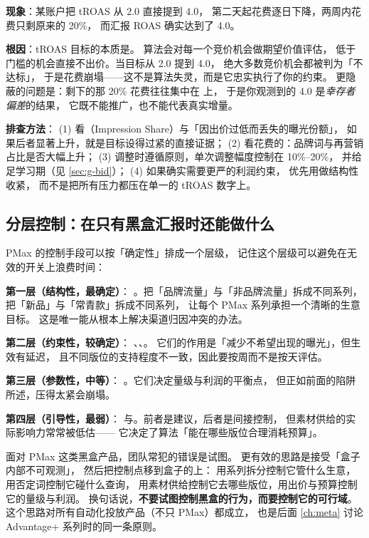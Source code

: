 \begin{pitfall}
\textbf{现象}：某账户把 tROAS 从 2.0 直接提到 4.0，
第二天起花费逐日下降，两周内花费只剩原来的 20\%，
而汇报 ROAS 确实达到了 4.0。

\textbf{根因}：tROAS 目标的本质是。
算法会对每一个竞价机会做期望价值评估，
低于门槛的机会直接不出价。当目标从 2.0 提到 4.0，
绝大多数竞价机会都被判为「不达标」，
于是花费崩塌——这不是算法失灵，而是它忠实执行了你的约束。
更隐蔽的问题是：剩下的那 20\% 花费往往集中在
上，
于是你观测到的 4.0 是\emph{幸存者偏差}的结果，
它既不能推广，也不能代表真实增量。

\textbf{排查方法}：
(1) 看（Impression Share）与「因出价过低而丢失的曝光份额」，
如果后者显著上升，就是目标设得过紧的直接证据；
(2) 看花费的：品牌词与再营销占比是否大幅上升；
(3) 调整时遵循原则，单次调整幅度控制在 10\%--20\%，
并给足学习期（见 \cref{sec:g-bid}）；
(4) 如果确实需要更严的利润约束，
优先用做结构性收紧，
而不是把所有压力都压在单一的 tROAS 数字上。
\end{pitfall}

\subsection{分层控制：在只有黑盒汇报时还能做什么}

PMax 的控制手段可以按「确定性」排成一个层级，
记住这个层级可以避免在无效的开关上浪费时间：

\textbf{第一层（结构性，最确定）}：
。把「品牌流量」与「非品牌流量」拆成不同系列，
把「新品」与「常青款」拆成不同系列，
让每个 PMax 系列承担一个清晰的生意目标。
这是唯一能从根本上解决渠道归因冲突的办法。

\textbf{第二层（约束性，较确定）}：
、、。
它们的作用是「减少不希望出现的曝光」，但生效有延迟，
且不同版位的支持程度不一致，因此要按周而不是按天评估。

\textbf{第三层（参数性，中等）}：
。它们决定量级与利润的平衡点，
但正如前面的陷阱所述，压得太紧会崩塌。

\textbf{第四层（引导性，最弱）}：
与。前者是建议，后者是间接控制，
但素材供给的实际影响力常常被低估——
它决定了算法「能在哪些版位合理消耗预算」。

\begin{insight}[黑盒产品的正确使用姿势]
面对 PMax 这类黑盒产品，团队常犯的错误是试图。
更有效的思路是接受「盒子内部不可观测」，
然后把控制点移到盒子的上：
用系列拆分控制它管什么生意，用否定词控制它碰什么查询，
用素材供给控制它去哪些版位，用出价与预算控制它的量级与利润。
换句话说，\textbf{不要试图控制黑盒的行为，而要控制它的可行域}。
这个思路对所有自动化投放产品（不只 PMax）都成立，
也是后面 \cref{ch:meta} 讨论 Advantage+ 系列时的同一条原则。
\end{insight}

